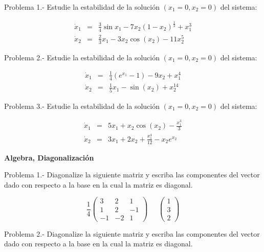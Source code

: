 \documentclass{article}
\begin{document}
Problema 1.- Estudie la estabilidad de la soluci\'on $(x_1=0,x_2=0)$ del sistema:

\begin{eqnarray}
  \dot{x}_1 &=& \frac{3}{4}\sin{x_1} - 7x_2(1-x_2)^{\frac{1}{3}} + x_1^3 \nonumber \\
  \dot{x}_2 &=& \frac{2}{3}x_1 - 3x_2 \cos(x_2) -11x_2^5
\end{eqnarray}

Problema 2.- Estudie la estabilidad de la soluci\'on $(x_1=0,x_2=0)$ del sistema:

\begin{eqnarray}
  \dot{x}_1 &=& \frac{1}{4}(e^{x_1}-1) -9x_2 + x_1^4 \nonumber \\
  \dot{x}_2 &=& \frac{1}{5}x_1 - \sin(x_2) + x_2^{14}
\end{eqnarray}

Problema 3.- Estudie la estabilidad de la soluci\'on $(x_1=0,x_2=0)$ del sistema:

\begin{eqnarray}
  \dot{x}_1 &=& 5x_1 + x_2 \cos(x_2) - \frac{x_1^3}{3} \nonumber \\
  \dot{x}_2 &=& 3x_1 + 2x_2 + \frac{x_1^4}{12}  - x_2e^{x_2}
\end{eqnarray}

\newpage

\begin{center}
 \textbf{Algebra, Diagonalizaci\'on}
\end{center}
\vspace{1cm}

Problema 1.- Diagonalize la siguiente matriz y escriba las componentes
del vector dado con respecto a la base en la cual la matriz es diagonal.

\begin{equation}
  \frac{1}{4}\left( 
    \begin{array}{ccc}
         3 & 2 & 1 \nonumber \\
         1 & 2 & -1 \nonumber \\
         -1 & -2 & 1 
    \end{array}
    \right)
    \;\;\;\;\;
    \left( 
    \begin{array}{c}
          1  \nonumber \\
          3  \nonumber \\
          2  
    \end{array}
    \right)
\end{equation}


Problema 2.- Diagonalize la siguiente matriz y escriba las componentes
del vector dado con respecto a la base en la cual la matriz es diagonal.
\end{document}
